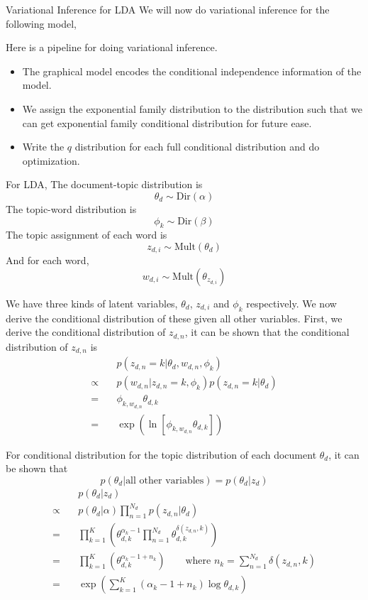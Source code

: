 \documentclass{beamer}
\begin{document}
\begin{frame}[allowframebreaks]{Variational Inference for LDA}
We will now do variational inference for the following model,

Here is a pipeline for doing variational inference.
\begin{itemize}
\item The graphical model encodes the conditional independence information of the model.
\item We assign the exponential family distribution to the distribution such that we can get exponential family conditional distribution for future ease.
\item Write the $q$ distribution for each full conditional distribution and do optimization.
\end{itemize}

\framebreak
For LDA,
The document-topic distribution is 
$$\theta_d \sim \text{Dir}(\alpha)$$
The topic-word distribution is
$$\phi_k \sim \text{Dir}(\beta)$$
The topic assignment of each word is
$$ z_{d,i} \sim \text{Mult}(\theta_d)$$
And for each word, 
$$ w_{d,i} \sim \text{Mult}(\theta_{z_{d,i}})$$

\framebreak
We have three kinds of latent variables, $\theta_d$, $z_{d,i}$ and $\phi_k$ respectively. We now derive the conditional distribution of these given all other variables.
First, we derive the conditional distribution of $z_{d,n}$, it can be shown that the conditional distribution of $z_{d,n}$ is
\begin{align*}
& p(z_{d,n} = k | \theta_d, w_{d,n}, \phi_k)\\
\propto \quad & p(w_{d,n} | z_{d,n} = k, \phi_k) p(z_{d,n} = k | \theta_d)\\
= \quad & \phi_{k, w_{d,n}} \theta_{d,k} \\
= \quad & \exp (\ln [\phi_{k, w_{d,n}}\theta_{d,k}])
\end{align*}
\framebreak

For conditional distribution for the topic distribution of each document $\theta_d$, it can be shown that $$p(\theta_d | \text{all other variables}) = p(\theta_d | z_d)$$
\begin{align*}
& p(\theta_d | z_d) \\
\propto \quad &  p(\theta_d | \alpha) \prod_{n=1}^{N_d} p(z_{d,n} | \theta_d)\\
= \quad & \prod_{k=1}^K (\theta_{d,k}^{\alpha_k - 1} \prod_{n=1}^{N_d} \theta_{d,k}^{\delta(z_{d,n}, k)})\\
= \quad & \prod_{k=1}^K (\theta_{d,k}^{\alpha_k - 1 + n_k}) \qquad \text{where } n_k = \sum_{n=1}^{N_d} \delta(z_{d,n}, k) \\
= \quad & \exp (\sum_{k=1}^K (\alpha_k - 1 + n_k) \log \theta_{d,k}) 
\end{align*}


\end{frame}
\end{document}
